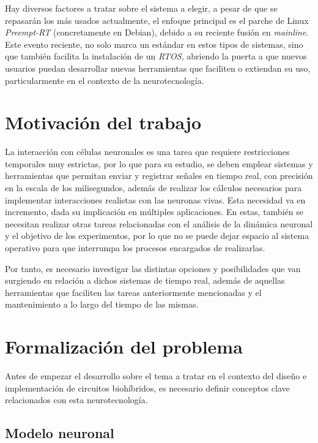 Hay diversos factores a tratar sobre el sistema a elegir, a pesar de que se repasarán los más usados actualmente, el enfoque principal es el parche de Linux \textit{Preempt-RT} (concretamente en Debian), debido a su reciente fusión en \textit{mainline}. Este evento reciente, no solo marca un estándar en estos tipos de sistemas, sino que también facilita la instalación de un \textit{RTOS}, abriendo la puerta a que nuevos usuarios puedan desarrollar nuevas herramientas que faciliten o extiendan su uso, particularmente en el contexto de la neurotecnología.



\section{Motivación del trabajo\label{SEC:MOTIVACION}}


La interacción con células neuronales es una tarea que requiere restricciones temporales muy estrictas,
por lo que para su estudio, se deben emplear sistemas y herramientas que permitan enviar y registrar
señales en tiempo real, con precisión en la escala de los milisegundos, además de realizar los cálculos necesarios para implementar interacciones realistas con las neuronas vivas.
Esta necesidad va en incremento, dada su implicación en múltiples aplicaciones. En estas, también se
necesitan realizar otras tareas relacionadas con el análisis de la dinámica neuronal y el objetivo de los experimentos, por lo que no se puede
dejar espacio al sistema operativo para que interrumpa los procesos encargados de realizarlas.

Por tanto, es necesario investigar las distintas opciones y posibilidades
que van surgiendo en relación a dichos sistemas de tiempo real, además de aquellas herramientas que faciliten las tareas
anteriormente mencionadas y el mantenimiento a lo largo del tiempo de las mismas.


\section{Formalización del problema\label{SEC:FORMALIZACION}}

Antes de empezar el desarrollo sobre el tema a tratar en el contexto del diseño e implementación de circuitos biohíbridos, es necesario definir conceptos clave relacionados con esta neurotecnología.


\subsection{Modelo neuronal\label{SS:MODELONEURONAL}}


